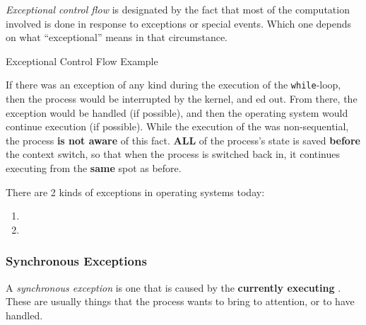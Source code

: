 \begin{definition}\label{def:Exceptional_Control_Flow}
  \emph{Exceptional control flow} is designated by the fact that most of the computation involved is done in response to exceptions or special events.
  Which one depends on what ``exceptional'' means in that circumstance.
\end{definition}

\begin{listing}[h!tbp]
\caption{Exceptional Control Flow Example}
\label{lst:Exceptional_Control_Flow}
\end{listing}

If there was an exception of any kind during the execution of the \texttt{while}-loop, then the process would be interrupted by the kernel, and ed out.
From there, the exception would be handled (if possible), and then the operating system would continue execution (if possible).
While the execution of the  was non-sequential, the process \textbf{is not aware} of this fact.
{\large\textbf{ALL}} of the process's state is saved \textbf{before} the context switch, so that when the process is switched back in, it continues executing from the \textbf{same} spot as before.

There are 2 kinds of exceptions in operating systems today:
\begin{enumerate}[noitemsep]
\item {}
\item {}
\end{enumerate}

\subsubsection{Synchronous Exceptions}\label{subsubsec:Synchronous_Exceptions}
\begin{definition}\label{def:Synchronous_Exception}
  A \emph{synchronous exception} is one that is caused by the \textbf{currently executing} .
  These are usually things that the process wants to bring to attention, or to have handled.
\end{definition}

